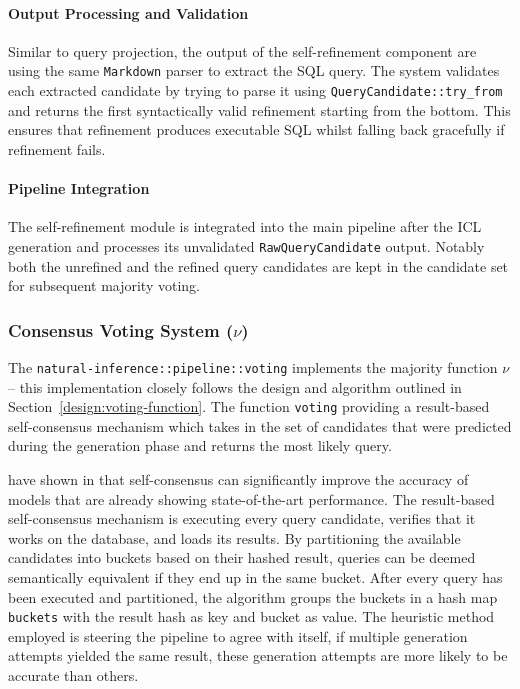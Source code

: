 \paragraph{Output Processing and Validation}

Similar to query projection, the output of the self-refinement component are
using the same \texttt{Markdown} parser to extract the SQL query. The
system validates each extracted candidate by trying to parse it using
\texttt{QueryCandidate\allowbreak::try\_from} and returns the first syntactically valid
refinement starting from the bottom. This ensures that refinement produces
executable SQL whilst falling back gracefully if refinement fails.

\paragraph{Pipeline Integration}

The self-refinement module is integrated into the main pipeline after the ICL
generation and processes its unvalidated \texttt{RawQueryCandidate} output.
Notably both the unrefined and the refined query candidates are kept in the
candidate set for subsequent majority voting.

\subsubsection{Consensus Voting System ($\nu$)}

The \texttt{natural-inference::pipeline::voting} implements the majority
function $\nu$ – this implementation closely follows the design and algorithm
outlined in Section~\ref{design:voting-function}. The function \texttt{voting}
providing a result-based self-consensus mechanism which takes in the set of
candidates that were predicted during the generation phase and returns the most
likely query.

\citeauthor{OmniSQL} have shown in \citeyear{OmniSQL} that self-consensus can 
significantly improve the accuracy of models that are already showing 
state-of-the-art performance. The result-based self-consensus mechanism is
executing every query candidate, verifies that it works on the database, and
loads its results. By partitioning the available candidates into buckets based
on their hashed result, queries can be deemed semantically equivalent if they
end up in the same bucket. After every query has been executed and partitioned,
the algorithm groups the buckets in a hash map \texttt{buckets} with the result
hash as key and bucket as value. The heuristic method employed is steering the
pipeline to agree with itself, if multiple generation attempts yielded the same
result, these generation attempts are more likely to be accurate than others.

